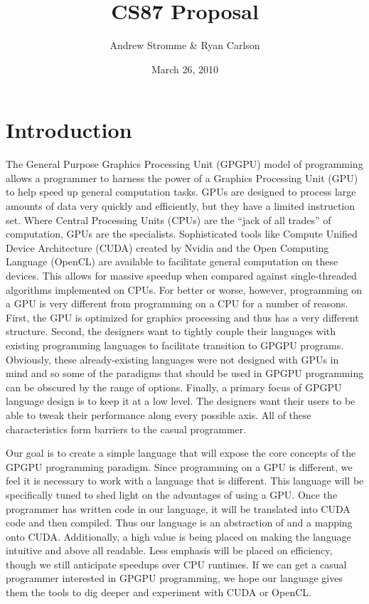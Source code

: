 \documentclass{article}
\begin{document}
\title{CS87 Proposal}
\author{Andrew Stromme \& Ryan Carlson}
\date{March 26, 2010}
\maketitle

\section{Introduction}

The General Purpose Graphics Processing Unit (GPGPU) model of programming allows a programmer to harness the power of a Graphics Processing Unit (GPU) to help speed up general computation tasks. GPUs are designed to process large amounts of data very quickly and efficiently, but they have a limited instruction set. Where Central Processing Units (CPUs) are the ``jack of all trades'' of computation, GPUs are the specialists. Sophisticated tools like Compute Unified Device Architecture (CUDA) created by Nvidia and the Open Computing Language (OpenCL) are available to facilitate general computation on these devices. This allows for massive speedup when compared against single-threaded algorithms implemented on CPUs. For better or worse, however, programming on a GPU is very different from programming on a CPU for a number of reasons. First, the GPU is optimized for graphics processing and thus has a very different structure. Second, the designers want to tightly couple their languages with existing programming languages to facilitate transition to GPGPU programs. Obviously, these already-existing languages were not designed with GPUs in mind and so some of the paradigms that should be used in GPGPU programming can be obscured by the range of options. Finally, a primary focus of GPGPU language design is to keep it at a low level. The designers want their users to be able to tweak their performance along every possible axis. All of these characteristics form barriers to the casual programmer.

Our goal is to create a simple language that will expose the core concepts of the GPGPU programming paradigm. Since programming on a GPU is different, we feel it is necessary to work with a language that is different. This language will be specifically tuned to shed light on the advantages of using a GPU. Once the programmer has written code in our language, it will be translated into CUDA code and then compiled. Thus our language is an abstraction of and a mapping onto CUDA. Additionally, a high value is being placed on making the language intuitive and above all readable. Less emphasis will be placed on efficiency, though we still anticipate speedups over CPU runtimes. If we can get a casual programmer interested in GPGPU programming, we hope our language gives them the tools to dig deeper and experiment with CUDA or OpenCL.
\end{document}
